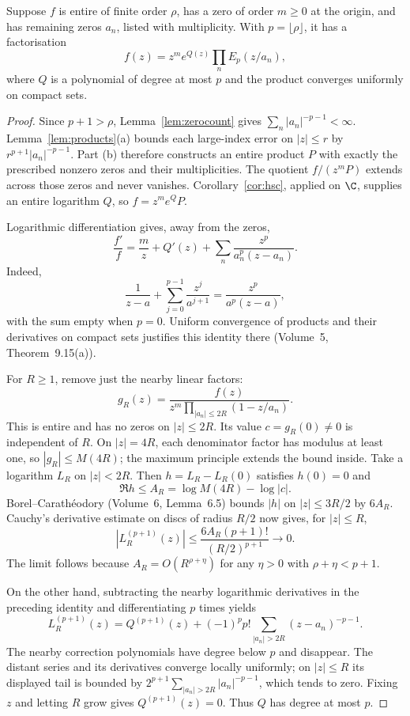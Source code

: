 \begin{theorem}\label{thm:hadamardgen}
Suppose $f$ is entire of finite order $\rho$, has a zero of order $m\ge0$ at the origin, and has remaining zeros $a_n$, listed with multiplicity. With $p=\lfloor\rho\rfloor$, it has a factorisation
\[f(z)=z^me^{Q(z)}\prod_nE_p(z/a_n),\]
where $Q$ is a polynomial of degree at most $p$ and the product converges uniformly on compact sets.
\end{theorem}
\begin{proof}
Since $p+1>\rho$, Lemma~\ref{lem:zerocount} gives $\sum_n|a_n|^{-p-1}<\infty$. Lemma~\ref{lem:products}(a) bounds each large-index error on $|z|\le r$ by $r^{p+1}|a_n|^{-p-1}$. Part (b) therefore constructs an entire product $P$ with exactly the prescribed nonzero zeros and their multiplicities. The quotient $f/(z^mP)$ extends across those zeros and never vanishes. Corollary~\ref{cor:hsc}, applied on $\C$, supplies an entire logarithm $Q$, so $f=z^me^QP$.

Logarithmic differentiation gives, away from the zeros,
\[\frac{f'}f=\frac mz+Q'(z)+\sum_n\frac{z^p}{a_n^p(z-a_n)}.\]
Indeed,
\[\frac1{z-a}+\sum_{j=0}^{p-1}\frac{z^j}{a^{j+1}}=\frac{z^p}{a^p(z-a)},\]
with the sum empty when $p=0$. Uniform convergence of products and their derivatives on compact sets justifies this identity there (Volume~5, Theorem~9.15(a)).

For $R\ge1$, remove just the nearby linear factors:
\[g_R(z)=\frac{f(z)}{z^m\prod_{|a_n|\le2R}(1-z/a_n)}.\]
This is entire and has no zeros on $|z|\le2R$. Its value $c=g_R(0)\ne0$ is independent of $R$. On $|z|=4R$, each denominator factor has modulus at least one, so $|g_R|\le M(4R)$; the maximum principle extends the bound inside. Take a logarithm $L_R$ on $|z|<2R$. Then $h=L_R-L_R(0)$ satisfies $h(0)=0$ and
\[\Re h\le A_R=\log M(4R)-\log|c|.\]
Borel--Carath\'eodory (Volume~6, Lemma~6.5) bounds $|h|$ on $|z|\le3R/2$ by $6A_R$. Cauchy's derivative estimate on discs of radius $R/2$ now gives, for $|z|\le R$,
\[|L_R^{(p+1)}(z)|\le\frac{6A_R(p+1)!}{(R/2)^{p+1}}\longrightarrow0.\]
The limit follows because $A_R=O(R^{\rho+\eta})$ for any $\eta>0$ with $\rho+\eta<p+1$.

On the other hand, subtracting the nearby logarithmic derivatives in the preceding identity and differentiating $p$ times yields
\[L_R^{(p+1)}(z)=Q^{(p+1)}(z)+(-1)^pp!\sum_{|a_n|>2R}(z-a_n)^{-p-1}.
\]
The nearby correction polynomials have degree below $p$ and disappear. The distant series and its derivatives converge locally uniformly; on $|z|\le R$ its displayed tail is bounded by $2^{p+1}\sum_{|a_n|>2R}|a_n|^{-p-1}$, which tends to zero. Fixing $z$ and letting $R$ grow gives $Q^{(p+1)}(z)=0$. Thus $Q$ has degree at most $p$.
\end{proof}

